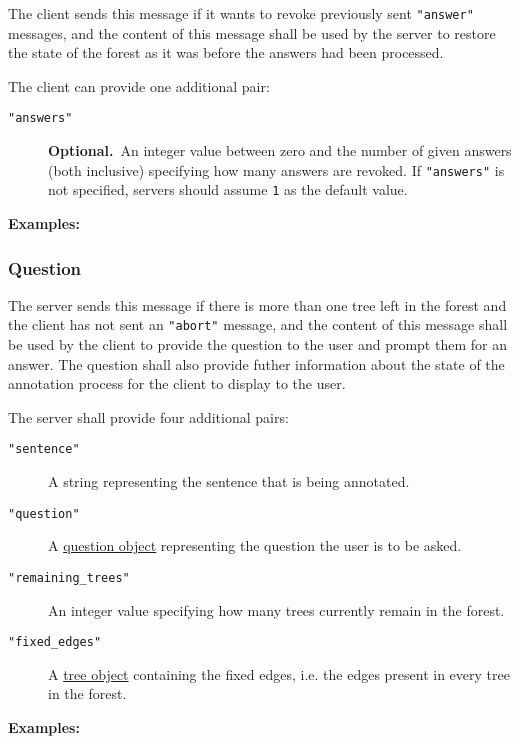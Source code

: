 \documentclass{scrartcl}
\newcommand{\jsstring}[1]{\texttt{\color{OrangeRed}"#1"}}
\newcommand{\js}[1]{\lstinline[style=JSONInputStyle];#1;}
\newcommand{\optional}{\textbf{Optional.}}
\newcommand{\Examples}{\noindent\textbf{Examples:}}
\begin{document}
The client sends this message if it wants to revoke previously sent \jsstring{answer} messages,
and the content of this message shall be used by the server to restore the state of the forest as it was before the answers had been processed.

The client can provide one additional pair:
\begin{description}
    \item[\jsstring{answers}] \optional\ An integer value between zero and the number of given answers (both inclusive) specifying how many answers are revoked.
        If \jsstring{answers} is not specified, servers should assume \js{1} as the default value.
\end{description}

\Examples



\subsubsection{Question}
\label{ssub:Question}

The server sends this message if there is more than one tree left in the forest and the client has not sent an \jsstring{abort} message,
and the content of this message shall be used by the client to provide the question to the user and prompt them for an answer.
The question shall also provide futher information about the state of the annotation process for the client to display to the user.

The server shall provide four additional pairs:
\begin{description}
    \item[\jsstring{sentence}] A string representing the sentence that is being annotated.
    \item[\jsstring{question}] A \hyperref[ssub:Question object]{question object} representing the question the user is to be asked.
    \item[\jsstring{remaining\_trees}] An integer value specifying how many trees currently remain in the forest.
    \item[\jsstring{fixed\_edges}] A \hyperref[ssub:Tree object]{tree object} containing the fixed edges, i.e. the edges present in every tree in the forest.
\end{description}

\Examples


\end{document}
